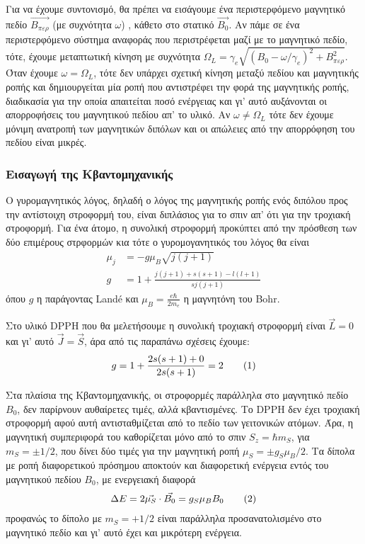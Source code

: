 \documentclass[a4paper]{article}
\newcommand\numberthis{\addtocounter{equation}{1}\tag{\theequation}}
\begin{document}
		Για να έχουμε συντονισμό, θα πρέπει να εισάγουμε ένα περιστερφόμενο μαγνητικό πεδίο $\vec{B_{περ}}$ (με συχνότητα $\omega$)	, κάθετο στο στατικό $\vec{B_0}$. Αν πάμε σε ένα περιστερφόμενο σύστημα αναφοράς που περιστρέφεται μαζί με το μαγνητικό πεδίο, τότε, έχουμε μεταπτωτική κίνηση με συχνότητα $\Omega_L = \gamma_e\sqrt{(B_0-\omega/\gamma_e)^2+B_{περ}^2}$.
		 Όταν έχουμε $\omega=\Omega_L$, τότε δεν υπάρχει σχετική κίνηση μεταξύ πεδίου και μαγνητικής ροπής και δημιουργείται μία ροπή που αντιστρέφει την φορά της μαγνητικής ροπής, διαδικασία για την οποία απαιτείται ποσό ενέργειας και γι' αυτό αυξάνονται οι απορροφήσεις του μαγνητικού πεδίου απ' το υλικό. 
		 Αν $\omega\neq\Omega_L$ τότε δεν έχουμε μόνιμη ανατροπή των μαγνητικών διπόλων και οι απώλειες από την απορρόφηση του πεδίου είναι μικρές.
		
		\subsubsection*{Εισαγωγή της Κβαντομηχανικής}
		
		Ο γυρομαγνητικός λόγος, δηλαδή ο λόγος της μαγνητικής ροπής ενός διπόλου προς την αντίστοιχη στροφορμή του, είναι διπλάσιος για το σπιν απ' ότι για την τροχιακή στροφορμή. Για ένα άτομο, η συνολική στροφορμή προκύπτει από την πρόσθεση των δύο επιμέρους στρφορμών κια τότε ο γυρομογανητικός του λόγος θα είναι 
		\begin{align*}
			\mu_j &= -g\mu_B\sqrt{j(j+1)} \\ 
			g     &= 1 + \frac{j(j+1)+s(s+1)-l(l+1)}{sj(j+1)}  
		\end{align*}
	όπου $g$ η παράγοντας Landé και $\mu_B=\frac{e\hbar}{2m_e}$ η μαγνητόνη του Bohr.
	
	Στο υλικό DPPH που θα μελετήσουμε η συνολική τροχιακή στροφορμή είναι $\vec{L}=0$ και γι' αυτό $\vec{J} = \vec{S}$, άρα από τις παραπάνω σχέσεις έχουμε:
	\begin{align*}\label{1}
		g = 1 + \frac{2s(s+1)+0}{2s(s+1)} = 2 \numberthis
	\end{align*}
		
		Στα πλαίσια της Κβαντομηχανικής, οι στροφορμές παράλληλα στο μαγνητικό πεδίο $B_0$, δεν παρίρνουν αυθαίρετες τιμές, αλλά κβαντισμένες. Το DPPH δεν έχει τροχιακή στροφορμή αφού αυτή αντισταθμίζεται από το πεδίο των γειτονικών ατόμων. Άρα, η μαγνητική συμπεριφορά του καθορίζεται μόνο από το σπιν $S_z = \hbar m_S$, για $m_S=\pm1/2$, που δίνει δύο τιμές για την μαγνητική ροπή $\mu_S=\pm g_S\mu_B/2$. Τα δίπολα με ροπή διαφορετικού πρόσημου αποκτούν και διαφορετική ενέργεια εντός του μαγνητικού πεδίου $B_0$, με ενεργειακή διαφορά 
		\begin{align*}\label{2}
			\Delta E = 2\vec{\mu_S}\cdot \vec{B_0} = g_S\mu_B B_0 \numberthis
		\end{align*}
	προφανώς το δίπολο με $m_S=+1/2$ είναι παράλληλα προσανατολισμένο στο μαγνητικό πεδίο και γι' αυτό έχει και μικρότερη ενέργεια.
	
\end{document}
